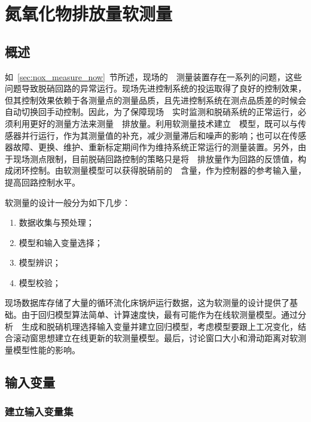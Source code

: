 \chapter{氮氧化物排放量软测量}
\label{chap:softsensor}
\section{概述}

如~\ref{sec:nox_measure_now}~节所述，现场的~~测量装置存在一系列的问题，这些问题导致脱硝回路的异常运行。现场先进控制系统的投运取得了良好的控制效果，但其控制效果依赖于各测量点的测量品质，且先进控制系统在测点品质差的时候会自动切换回手动控制。因此，为了保障现场~~实时监测和脱硝系统的正常运行，必须利用更好的测量方法来测量~~排放量。利用软测量技术建立~~模型，既可以与传感器并行运行，作为其测量值的补充，减少测量滞后和噪声的影响；也可以在传感器故障、更换、维护、重新标定期间作为维持系统正常运行的测量装置。另外，由于现场测点限制，目前脱硝回路控制的策略只是将~~排放量作为回路的反馈值，构成闭环控制。由软测量模型可以获得脱硝前的~~含量，作为控制器的参考输入量，提高回路控制水平。

软测量的设计一般分为如下几步\cite{Fortuna2007Soft}：
\begin{enumerate}
\item {数据收集与预处理；}
\item {模型和输入变量选择；}
\item {模型辨识；}
\item {模型校验；}
\end{enumerate}

现场数据库存储了大量的循环流化床锅炉运行数据，这为软测量的设计提供了基础。由于回归模型算法简单、计算速度快，最有可能作为在线软测量模型。通过分析~~生成和脱硝机理选择输入变量并建立回归模型，考虑模型要跟上工况变化，结合滚动窗思想建立在线更新的软测量模型。最后，讨论窗口大小和滑动距离对软测量模型性能的影响。


\section{输入变量}
\subsection{建立输入变量集}

